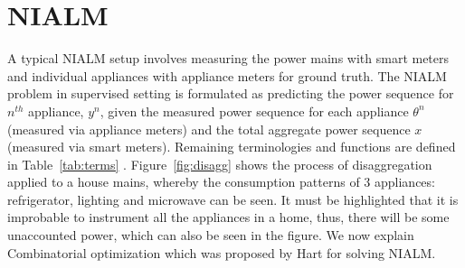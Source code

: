 \documentclass[conference]{IEEEtran}
\newcommand{\figref}[1]{Figure~\ref{#1}}
\newcommand{\tabref}[1]{Table~\ref{#1}}
\begin{document}



\section{NIALM}
\noindent A typical NIALM setup involves measuring the power mains with smart meters and individual appliances with appliance meters for ground truth. The NIALM problem in supervised setting is formulated as predicting the power sequence for $n^{th}$ appliance, $y^n$, given the measured power sequence for each appliance $\theta^n$ (measured via appliance meters) and the total aggregate power sequence $x$ (measured via smart meters). Remaining terminologies and functions are defined in \tabref{tab:terms} \cite{redd,parson2012_aaai,hart}. \figref{fig:disagg} shows the process of disaggregation applied to a house mains, whereby the consumption patterns of 3 appliances: refrigerator, lighting and microwave can be seen. It must be highlighted that it is improbable to instrument all the appliances in a home, thus, there will be some unaccounted power, which can also be seen in the figure. We now explain Combinatorial optimization which was proposed by Hart \cite{hart} for solving NIALM.
\end{document}
